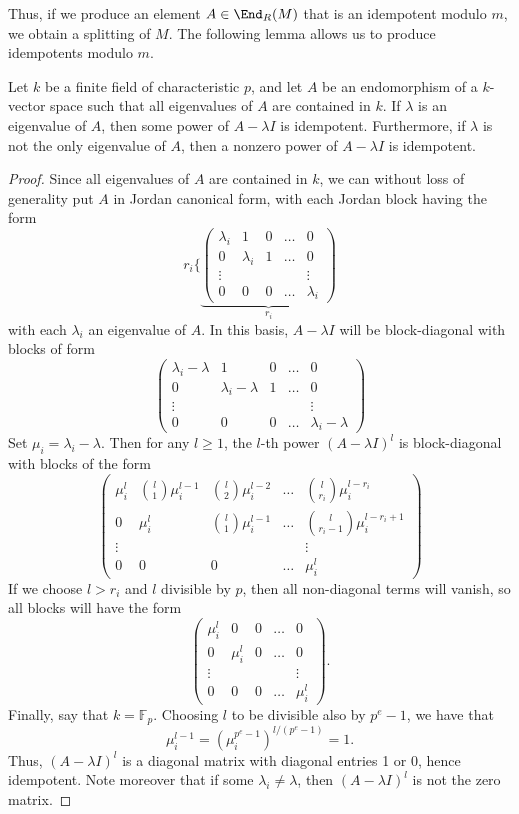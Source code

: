 \documentclass[12pt]{article}
\let\l\lambda
\numberwithin{equation}{section}
\theoremstyle{theorem}
\numberwithin{thm}{section}
\theoremstyle{definition}
\begin{document}
Thus, if we produce an element $A\in \End_R(M)$ that is an idempotent modulo $m$, we obtain a splitting of $M$.
The following lemma allows us to produce idempotents modulo $m$.

\begin{lem}\label{lem:jordan}
  Let $k$ be a finite field of characteristic $p$, and let $A$ be an endomorphism of a $k$-vector space such that all eigenvalues of $A$ are contained in $k$. If $\l$ is an eigenvalue of $A$, then some power of $A-\l I$ is idempotent.
Furthermore, if $\l$ is not the only eigenvalue of $A$, then a  nonzero power of $A-\l I$ is idempotent.
\end{lem}
\begin{proof}
  Since all eigenvalues of $A$ are contained in $k$, we can without loss of generality put $A$ in Jordan canonical form, with each Jordan block having the form
  \[ r_i\Biggl\{
  \underbrace{\begin{pmatrix}
      \l_i & 1 & 0 & \dots & 0 \\
      0 & \l_i & 1  & \dots & 0 \\
      \vdots & & & & \vdots \\
      0 & 0 & 0 & \dots & \l_i
  \end{pmatrix}}_{r_i} \]
  with each $\l_i$ an eigenvalue of $A$.
  In this basis, $A-\l I$ will be block-diagonal with blocks of form
  \[ \begin{pmatrix}
    \l_i-\l & 1 & 0 & \dots & 0 \\
    0 & \l_i-\l & 1 & \dots & 0 \\
    \vdots & & & & \vdots \\
    0 & 0 & 0 & \dots & \l_i-\l
  \end{pmatrix} \]
  Set $\mu_i=\l_i-\l$. Then for any $l\geq 1$, the $l$-th power $(A-\l I)^l$ is block-diagonal with blocks of the form
  \[ \begin{pmatrix}
    \mu_i^l & \binom{l}1\mu_i^{l-1} & \binom{l}2\mu_i^{l-2} & \dots & \binom{l}{r_i}\mu_i^{l-r_i} \\
    0 & \mu_i^l & \binom{l}1\mu_i^{l-1} & \dots & \binom{l}{r_i-1}\mu_i^{l-r_i+1} \\
    \vdots & & & & \vdots \\
    0 & 0 & 0 & \dots & \mu_i^l
  \end{pmatrix} \]
  If we choose $l > r_i$ and $l$ divisible by $p$, then all non-diagonal terms will vanish, so all blocks will have the form
  \[ \begin{pmatrix}
    \mu_i^l & 0 & 0 & \dots & 0 \\
    0 & \mu_i^l & 0 & \dots & 0 \\
    \vdots & & & & \vdots \\
    0 & 0 & 0 & \dots & \mu_i^l
  \end{pmatrix}. \]
  Finally, say that $k=\mathbb F_p$. Choosing $l$ to be divisible also by $p^e-1$, we have that $$\mu_i^{l-1} = (\mu_i^{p^{e}-1})^{l/(p^{e}-1)} =1.$$
  Thus, $(A-\l I)^l$ is a diagonal matrix with diagonal entries 1 or 0, hence idempotent. Note moreover that if some $\l_i\neq \l$, then $(A-\l I)^l$ is not the zero matrix.
\end{proof}
\end{document}
